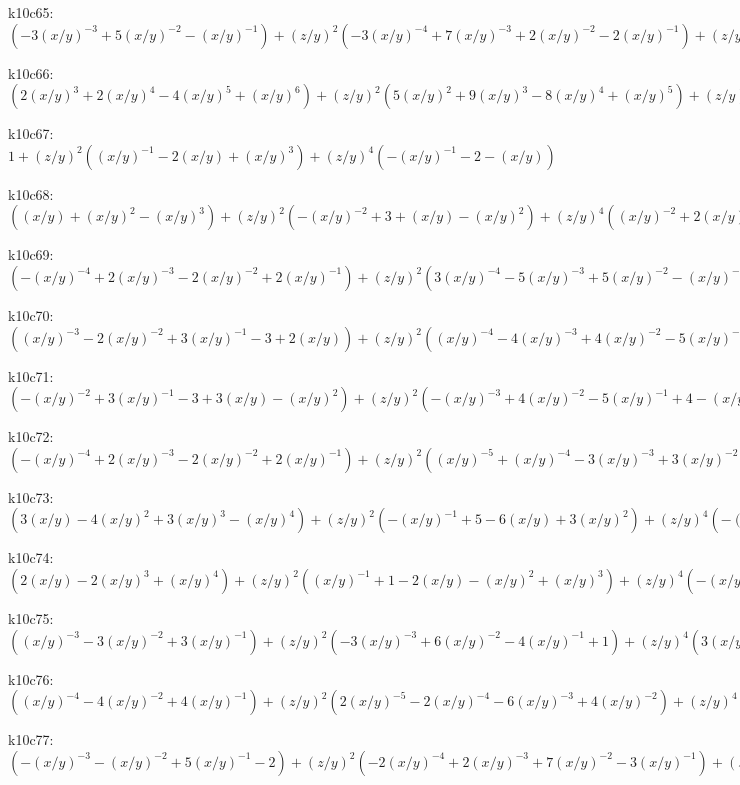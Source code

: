 k10c65: $ (-3(x/y)^{-3}+5(x/y)^{-2}-(x/y)^{-1})  +(z/y)^{2}(-3(x/y)^{-4}+7(x/y)^{-3}+2(x/y)^{-2}-2(x/y)^{-1})  +(z/y)^{4}(-(x/y)^{-5}+4(x/y)^{-4}+3(x/y)^{-3}-(x/y)^{-2})  +(z/y)^{6}((x/y)^{-5}+(x/y)^{-4}) $ 

k10c66: $ (2(x/y)^{3}+2(x/y)^{4}-4(x/y)^{5}+(x/y)^{6})  +(z/y)^{2}(5(x/y)^{2}+9(x/y)^{3}-8(x/y)^{4}+(x/y)^{5})  +(z/y)^{4}(4(x/y)+8(x/y)^{2}-3(x/y)^{3})  +(z/y)^{6}(1+2(x/y)) $ 

k10c67: $ 1  +(z/y)^{2}((x/y)^{-1}-2(x/y)+(x/y)^{3})  +(z/y)^{4}(-(x/y)^{-1}-2-(x/y)) $ 

k10c68: $ ((x/y)+(x/y)^{2}-(x/y)^{3})  +(z/y)^{2}(-(x/y)^{-2}+3+(x/y)-(x/y)^{2})  +(z/y)^{4}((x/y)^{-2}+2(x/y)^{-1}+1) $ 

k10c69: $ (-(x/y)^{-4}+2(x/y)^{-3}-2(x/y)^{-2}+2(x/y)^{-1})  +(z/y)^{2}(3(x/y)^{-4}-5(x/y)^{-3}+5(x/y)^{-2}-(x/y)^{-1})  +(z/y)^{4}(-3(x/y)^{-4}+3(x/y)^{-3}-(x/y)^{-2})  +(x/y)^{-4}(z/y)^{6} $ 

k10c70: $ ((x/y)^{-3}-2(x/y)^{-2}+3(x/y)^{-1}-3+2(x/y))  +(z/y)^{2}((x/y)^{-4}-4(x/y)^{-3}+4(x/y)^{-2}-5(x/y)^{-1}+1)  +(z/y)^{4}(-2(x/y)^{-4}+3(x/y)^{-3}-2(x/y)^{-2})  +(x/y)^{-4}(z/y)^{6} $ 

k10c71: $ (-(x/y)^{-2}+3(x/y)^{-1}-3+3(x/y)-(x/y)^{2})  +(z/y)^{2}(-(x/y)^{-3}+4(x/y)^{-2}-5(x/y)^{-1}+4-(x/y))  +(z/y)^{4}(2(x/y)^{-3}-3(x/y)^{-2}+2(x/y)^{-1})  -(x/y)^{-3}(z/y)^{6} $ 

k10c72: $ (-(x/y)^{-4}+2(x/y)^{-3}-2(x/y)^{-2}+2(x/y)^{-1})  +(z/y)^{2}((x/y)^{-5}+(x/y)^{-4}-3(x/y)^{-3}+3(x/y)^{-2})  +(z/y)^{4}((x/y)^{-6}-2(x/y)^{-5}-3(x/y)^{-4}+(x/y)^{-3})  +(z/y)^{6}(-(x/y)^{-6}-(x/y)^{-5}) $ 

k10c73: $ (3(x/y)-4(x/y)^{2}+3(x/y)^{3}-(x/y)^{4})  +(z/y)^{2}(-(x/y)^{-1}+5-6(x/y)+3(x/y)^{2})  +(z/y)^{4}(-(x/y)^{-2}+3(x/y)^{-1}-3)  +(x/y)^{-2}(z/y)^{6} $ 

k10c74: $ (2(x/y)-2(x/y)^{3}+(x/y)^{4})  +(z/y)^{2}((x/y)^{-1}+1-2(x/y)-(x/y)^{2}+(x/y)^{3})  +(z/y)^{4}(-(x/y)^{-1}-2-(x/y)) $ 

k10c75: $ ((x/y)^{-3}-3(x/y)^{-2}+3(x/y)^{-1})  +(z/y)^{2}(-3(x/y)^{-3}+6(x/y)^{-2}-4(x/y)^{-1}+1)  +(z/y)^{4}(3(x/y)^{-3}-3(x/y)^{-2}+(x/y)^{-1})  -(x/y)^{-3}(z/y)^{6} $ 

k10c76: $ ((x/y)^{-4}-4(x/y)^{-2}+4(x/y)^{-1})  +(z/y)^{2}(2(x/y)^{-5}-2(x/y)^{-4}-6(x/y)^{-3}+4(x/y)^{-2})  +(z/y)^{4}((x/y)^{-6}-3(x/y)^{-5}-4(x/y)^{-4}+(x/y)^{-3})  +(z/y)^{6}(-(x/y)^{-6}-(x/y)^{-5}) $ 

k10c77: $ (-(x/y)^{-3}-(x/y)^{-2}+5(x/y)^{-1}-2)  +(z/y)^{2}(-2(x/y)^{-4}+2(x/y)^{-3}+7(x/y)^{-2}-3(x/y)^{-1})  +(z/y)^{4}(-(x/y)^{-5}+3(x/y)^{-4}+4(x/y)^{-3}-(x/y)^{-2})  +(z/y)^{6}((x/y)^{-5}+(x/y)^{-4}) $ 

